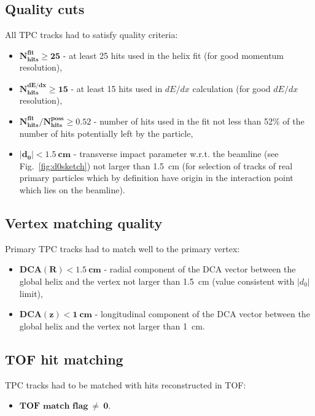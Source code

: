\subsection{Quality cuts}\label{sec:TpcQualityCuts}
All TPC tracks had to satisfy quality criteria:
\begin{itemize}
\item \textbf{$\bm{N_{\textrm{hits}}^{\textrm{fit}}\geq25}$} - at least 25 hits used in the helix fit (for good momentum resolution),
\item \textbf{$\bm{N_{\textrm{hits}}^{\textrm{dE/dx}}\geq15}$} - at least 15 hits used in $dE/dx$ calculation (for good $dE/dx$ resolution),
\item \textbf{$\bm{N_{\textrm{hits}}^{\textrm{fit}}/N_{\textrm{hits}}^{\textrm{poss}}\geq0.52}$} - number of hits used in the fit not less than 52\% of the number of hits potentially left by the particle,
\item \textbf{$\bm{|d_{0}|<1.5~\text{cm}}$} - transverse impact parameter w.r.t. the beamline (see Fig.~\ref{fig:d0sketch}) not larger than 1.5~cm (for selection of tracks of real primary particles which by definition have origin in the interaction point which lies on the beamline).
\end{itemize}
\subsection{Vertex matching quality}\label{sec:TpcDcaCuts}
Primary TPC tracks had to match well to the primary vertex:
\begin{itemize}
 \item \textbf{$\bm{\textrm{DCA}(R)<1.5~\text{cm}}$} - radial component of the DCA vector between the global helix and the vertex not larger than 1.5~cm (value consistent with $|d_{0}|$ limit),
 \item \textbf{$\bm{\textrm{DCA}(z)<1~\text{cm}}$} - longitudinal component of the DCA vector between the global helix and the vertex not larger than 1~cm.
 \end{itemize}
\subsection{TOF hit matching}\label{sec:TpcTofMatchingRequirement}
TPC tracks had to be matched with hits reconstructed in TOF:
\begin{itemize}
 \item \textbf{$\bm{\text{TOF match flag}~\neq~0}$}.
\end{itemize}

